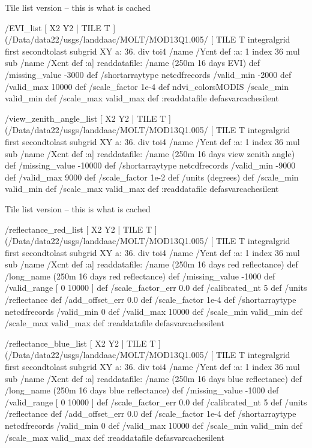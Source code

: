 Tile list version -- this is what is cached
\begin{ingrid}
/EVI_list
{
[ X2 Y2 | TILE T ]
(/Data/data22/usgs/landdaac/MOLT/MOD13Q1.005/%
 [ TILE T integralgrid first secondtolast subgrid
XY
  a:
    36. div
    toi4
    /name /Ycnt def
    :a: 1 index
      36 mul
      sub
     /name /Xcnt def
     :a]
readdatafile:
/name (250m 16 days EVI) def
/missing_value -3000 def
/shortarraytype netcdfrecords
/valid_min -2000 def
/valid_max 10000 def
/scale_factor 1e-4 def
ndvi_colorsMODIS
/scale_min valid_min def
/scale_max valid_max def
:readdatafile
} defasvarcachesilent
\end{ingrid}
\begin{ingrid}
/view_zenith_angle_list
{
[ X2 Y2 | TILE T ]
(/Data/data22/usgs/landdaac/MOLT/MOD13Q1.005/%
 [ TILE T integralgrid first secondtolast subgrid
XY
  a:
    36. div
    toi4
    /name /Ycnt def
    :a: 1 index
      36 mul
      sub
     /name /Xcnt def
     :a]
readdatafile:
/name (250m 16 days view zenith angle) def
/missing_value -10000 def
/shortarraytype netcdfrecords
/valid_min -9000 def
/valid_max 9000 def
/scale_factor 1e-2 def
/units (degrees) def
/scale_min valid_min def
/scale_max valid_max def
:readdatafile
} defasvarcachesilent
\end{ingrid}
Tile list version -- this is what is cached
\begin{ingrid}
/reflectance_red_list
{
[ X2 Y2 | TILE T ]
(/Data/data22/usgs/landdaac/MOLT/MOD13Q1.005/%
 [ TILE T integralgrid first secondtolast subgrid
XY
  a:
    36. div
    toi4
    /name /Ycnt def
    :a: 1 index
      36 mul
      sub
     /name /Xcnt def
     :a]
readdatafile:
/name (250m 16 days red reflectance) def
/long_name (250m 16 days red reflectance) def
 /missing_value -1000 def
 /valid_range [ 0 10000 ] def
 /scale_factor_err 0.0 def
  /calibrated_nt 5 def
 /units /reflectance def
 /add_offset_err 0.0 def
 /scale_factor 1e-4 def
/shortarraytype netcdfrecords
/valid_min 0 def
/valid_max 10000 def
/scale_min valid_min def
/scale_max valid_max def
:readdatafile
} defasvarcachesilent
\end{ingrid}
\begin{ingrid}
/reflectance_blue_list
{
[ X2 Y2 | TILE T ]
(/Data/data22/usgs/landdaac/MOLT/MOD13Q1.005/%
 [ TILE T integralgrid first secondtolast subgrid
XY
  a:
    36. div
    toi4
    /name /Ycnt def
    :a: 1 index
      36 mul
      sub
     /name /Xcnt def
     :a]
readdatafile:
/name (250m 16 days blue reflectance) def
 /long_name (250m 16 days blue reflectance) def
 /missing_value -1000 def
 /valid_range [ 0 10000 ] def
 /scale_factor_err 0.0 def
  /calibrated_nt 5 def
 /units /reflectance def
 /add_offset_err 0.0 def
 /scale_factor 1e-4 def
/shortarraytype netcdfrecords
/valid_min 0 def
/valid_max 10000 def
/scale_min valid_min def
/scale_max valid_max def
:readdatafile
} defasvarcachesilent
\end{ingrid}
